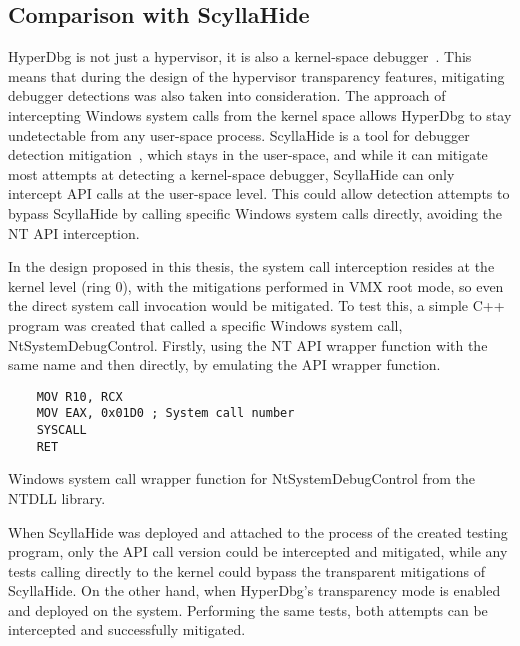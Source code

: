 \subsection{Comparison with ScyllaHide}\label{scyllahide-comparison}
HyperDbg is not just a hypervisor, it is also a kernel-space debugger~\cite{karvandi2022hyperdbg}. This means that during the design of 
the hypervisor transparency features, mitigating debugger detections was also taken into consideration. The approach of intercepting Windows system calls 
from the kernel space allows HyperDbg to stay undetectable from any user-space process. ScyllaHide is a tool for debugger detection mitigation~\cite{scyllahide}, 
which stays in the user-space, and while it can mitigate most attempts at detecting a kernel-space debugger, ScyllaHide can only intercept API calls at the user-space level. 
This could allow detection attempts to bypass ScyllaHide by calling specific Windows system calls directly, avoiding the NT API interception. 

In the design proposed in this thesis, the system call interception resides at the kernel level (ring 0), with the mitigations performed in VMX root mode, 
so even the direct system call invocation would be mitigated. To test this, a simple C++ program was created that called a specific Windows system call, 
NtSystemDebugControl. Firstly, using the NT API wrapper function with the same name and then directly, by emulating the API wrapper function.
\begin{listing}[!tbp]

\begin{verbatim}
    MOV R10, RCX
    MOV EAX, 0x01D0 ; System call number
    SYSCALL
    RET
\end{verbatim}
\caption{Windows system call wrapper function for NtSystemDebugControl from the NTDLL library.}
\label{lst:syscall-wrapper}
\end{listing}
When ScyllaHide was deployed and attached to the process of the created testing program, only the API call version could be intercepted and mitigated, 
while any tests calling directly to the kernel could bypass the transparent mitigations of ScyllaHide.
On the other hand, when HyperDbg's transparency mode is enabled and deployed on the system. Performing the same tests, both attempts can be intercepted and 
successfully mitigated.



